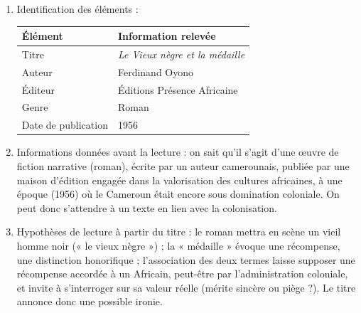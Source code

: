 \documentclass[11pt]{article}
\begin{document}
\begin{corrige}

\begin{enumerate}
\item Identification des éléments :
\begin{center}
\begin{tabularx}{\linewidth}{|l|X|}\hline
\rowcolor{popblueL} \textbf{Élément} & \textbf{Information relevée} \\ \hline
Titre & \emph{Le Vieux nègre et la médaille} \\ \hline
Auteur & Ferdinand Oyono \\ \hline
Éditeur & Éditions Présence Africaine \\ \hline
Genre & Roman \\ \hline
Date de publication & 1956 \\ \hline
\end{tabularx}
\end{center}

\item Informations données avant la lecture : on sait qu'il s'agit d'une œuvre de fiction narrative (roman), écrite par un auteur camerounais, publiée par une maison d'édition engagée dans la valorisation des cultures africaines, à une époque (1956) où le Cameroun était encore sous domination coloniale. On peut donc s'attendre à un texte en lien avec la colonisation.

\item Hypothèses de lecture à partir du titre : le roman mettra en scène un vieil homme noir (« le vieux nègre ») ; la « médaille » évoque une récompense, une distinction honorifique ; l'association des deux termes laisse supposer une récompense accordée à un Africain, peut-être par l'administration coloniale, et invite à s'interroger sur sa valeur réelle (mérite sincère ou piège ?). Le titre annonce donc une possible ironie.
\end{enumerate}
\end{corrige}
\end{document}

